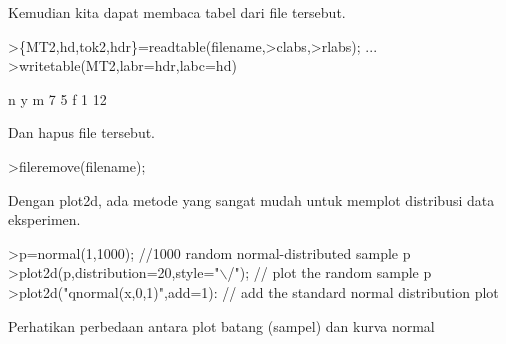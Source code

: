 \documentclass[a4paper,10pt]{article}
\begin{document}
\begin{eulernotebook}
\begin{eulercomment}
\begin{eulercomment}
\begin{eulercomment}
\begin{eulercomment}
\begin{eulercomment}
\begin{eulercomment}
\begin{eulercomment}
\begin{eulercomment}
\begin{eulercomment}
\begin{eulercomment}
\begin{eulercomment}
\begin{eulercomment}
\begin{eulercomment}
\begin{eulercomment}
\begin{eulercomment}
\begin{eulercomment}
\begin{eulercomment}
\begin{eulercomment}
\begin{eulercomment}
\begin{eulercomment}
\begin{eulercomment}
\begin{eulercomment}
\begin{eulercomment}
\begin{eulercomment}
\begin{eulercomment}
\begin{eulercomment}
\begin{eulercomment}
\begin{eulercomment}
\begin{eulercomment}
\begin{eulercomment}
\begin{eulercomment}
\begin{eulercomment}
\begin{eulercomment}
\begin{eulercomment}
\begin{eulercomment}
\begin{eulercomment}
\begin{eulercomment}
\begin{eulercomment}
\begin{eulercomment}
\begin{eulercomment}
\begin{eulercomment}
\begin{eulercomment}
\begin{eulercomment}
\begin{eulercomment}
\begin{eulercomment}
Kemudian kita dapat membaca tabel dari file tersebut.
\end{eulercomment}
\begin{eulerprompt}
>\{MT2,hd,tok2,hdr\}=readtable(filename,>clabs,>rlabs); ...
>writetable(MT2,labr=hdr,labc=hd)
\end{eulerprompt}
\begin{euleroutput}
                     n         y
           m         7         5
           f         1        12
\end{euleroutput}
\begin{eulercomment}
Dan hapus file tersebut.
\end{eulercomment}
\begin{eulerprompt}
>fileremove(filename);
\end{eulerprompt}
\begin{eulercomment}
Dengan plot2d, ada metode yang sangat mudah untuk memplot distribusi
data eksperimen.
\end{eulercomment}
\begin{eulerprompt}
>p=normal(1,1000); //1000 random normal-distributed sample p
>plot2d(p,distribution=20,style="\(\backslash\)/"); // plot the random sample p
>plot2d("qnormal(x,0,1)",add=1): // add the standard normal distribution plot
\end{eulerprompt}
\begin{eulercomment}
Perhatikan perbedaan antara plot batang (sampel) dan kurva normal

\end{eulercomment}
\end{eulercomment}
\end{eulercomment}
\end{eulercomment}
\end{eulercomment}
\end{eulercomment}
\end{eulercomment}
\end{eulercomment}
\end{eulercomment}
\end{eulercomment}
\end{eulercomment}
\end{eulercomment}
\end{eulercomment}
\end{eulercomment}
\end{eulercomment}
\end{eulercomment}
\end{eulercomment}
\end{eulercomment}
\end{eulercomment}
\end{eulercomment}
\end{eulercomment}
\end{eulercomment}
\end{eulercomment}
\end{eulercomment}
\end{eulercomment}
\end{eulercomment}
\end{eulercomment}
\end{eulercomment}
\end{eulercomment}
\end{eulercomment}
\end{eulercomment}
\end{eulercomment}
\end{eulercomment}
\end{eulercomment}
\end{eulercomment}
\end{eulercomment}
\end{eulercomment}
\end{eulercomment}
\end{eulercomment}
\end{eulercomment}
\end{eulercomment}
\end{eulercomment}
\end{eulercomment}
\end{eulercomment}
\end{eulercomment}
\end{eulernotebook}
\end{document}
